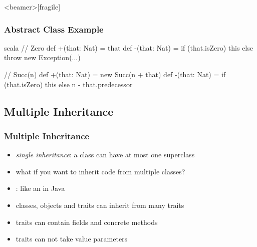 \documentclass[dvipsnames]{beamer}
\theoremstyle{plain}
\begin{document}
\begin{frame}<beamer>[fragile]
  \frametitle{Abstract Class Example}

  \begin{example}[Scala]
    \begin{pygments}{scala}
// Zero
def +(that: Nat) = that
def -(that: Nat) =
    if (that.isZero) this
    else throw new Exception(...)

// Succ(n)
def +(that: Nat) = new Succ(n + that)
def -(that: Nat) =
    if (that.isZero) this
    else n - that.predecessor
    \end{pygments}
  \end{example}
\end{frame}

\subsection{Multiple Inheritance}

\begin{frame}
  \frametitle{Multiple Inheritance}

  \begin{itemize}
    \item \emph{single inheritance}: a class can have at most one superclass
    \item what if you want to inherit code from multiple classes?

    \pause
    \medskip
    \item {}: like an  in Java
    \item classes, objects and traits can inherit from many traits
    \item traits can contain fields and concrete methods
    \item traits can not take value parameters
  \end{itemize}
\end{frame}
\end{document}
